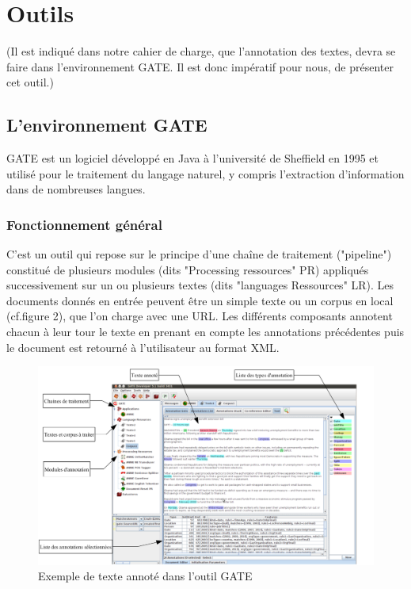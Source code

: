 \documentclass[a4paper, 11pt]{report}
\begin{document}
\section{Outils}%
(Il est indiqué dans notre cahier de charge, que l'annotation des textes, devra se faire dans l'environnement GATE. Il est donc impératif pour nous, de présenter cet outil.)
\subsection{L'environnement GATE}
GATE est un logiciel développé en Java à l’université de Sheffield en 1995 et utilisé pour
le traitement du langage naturel, y compris l’extraction d’information dans de nombreuses
langues. 
\subsubsection{Fonctionnement général}
C'est un outil qui repose sur le principe d'une chaîne de traitement ("pipeline") constitué de plusieurs modules (dits "Processing ressources" PR) appliqués successivement sur un ou plusieurs textes (dits "languages Ressources" LR). Les documents donnés en entrée peuvent être un simple texte ou un corpus en local (cf.figure 2), que l'on charge avec une URL. Les différents composants annotent chacun à leur tour le texte en prenant en compte les annotations précédentes puis le document est retourné à l'utilisateur au format XML.\cite{SL10}
\begin{figure}[H]
\begin{center}
\includegraphics[scale=0.3]{img/exempleAnnotationGATE.png} 
\end{center}
\caption{Exemple de texte annoté dans l'outil GATE}
\end{figure}
\end{document}
